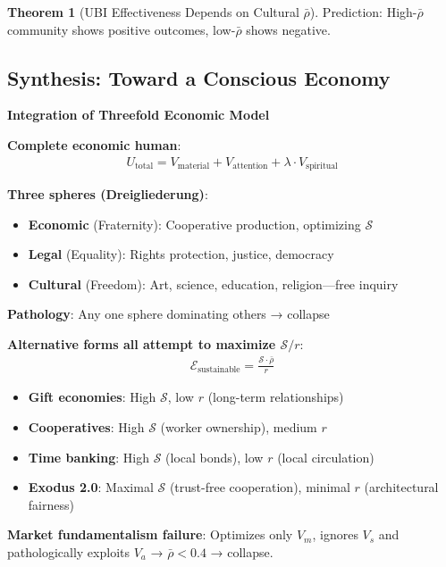 \documentclass[11pt,a4paper]{article}
\theoremstyle{definition}
\newtheorem{theorem}{Theorem}[section]
\theoremstyle{remark}
\begin{document}
\begin{enumerate}
\begin{theorem}[UBI Effectiveness Depends on Cultural \(\bar{\rho}\)]
Prediction: High-\(\bar{\rho}\) community shows positive outcomes, low-\(\bar{\rho}\) shows negative.
\end{theorem}

\subsection{Synthesis: Toward a Conscious Economy}

\begin{mdframed}[backgroundcolor=purple!10,linewidth=2pt]
\textbf{Integration of Threefold Economic Model}

\textbf{Complete economic human}:
\begin{align}
U_{\text{total}} = V_{\text{material}} + V_{\text{attention}} + \lambda \cdot V_{\text{spiritual}}
\end{align}

\textbf{Three spheres (Dreigliederung)}:
\begin{itemize}
    \item \textbf{Economic} (Fraternity): Cooperative production, optimizing \(\mathcal{S}\)
    \item \textbf{Legal} (Equality): Rights protection, justice, democracy
    \item \textbf{Cultural} (Freedom): Art, science, education, religion—free inquiry
\end{itemize}

\textbf{Pathology}: Any one sphere dominating others → collapse

\textbf{Alternative forms all attempt to maximize \(\mathcal{S}/r\)}:
\begin{align}
\mathcal{E}_{\text{sustainable}} = \frac{\mathcal{S} \cdot \bar{\rho}}{r}
\end{align}

\begin{itemize}
    \item \textbf{Gift economies}: High \(\mathcal{S}\), low \(r\) (long-term relationships)
    \item \textbf{Cooperatives}: High \(\mathcal{S}\) (worker ownership), medium \(r\)
    \item \textbf{Time banking}: High \(\mathcal{S}\) (local bonds), low \(r\) (local circulation)
    \item \textbf{Exodus 2.0}: Maximal \(\mathcal{S}\) (trust-free cooperation), minimal \(r\) (architectural fairness)
\end{itemize}

\textbf{Market fundamentalism failure}: Optimizes only \(V_m\), ignores \(V_s\) and pathologically exploits \(V_a\) → \(\bar{\rho} < 0.4\) → collapse.


\end{mdframed}
\end{enumerate}
\end{document}
